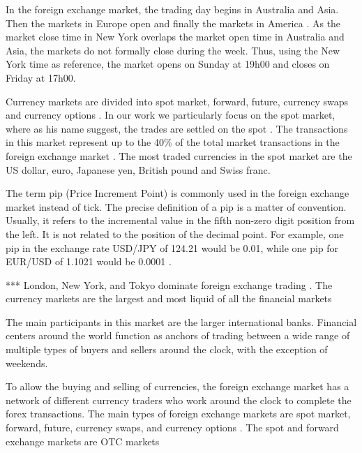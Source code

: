In the foreign exchange market, the trading day begins in Australia and Asia.
Then the markets in Europe open and finally the markets in America
\cite{forex_market_micro,forex_structure,book_forex_2,book_forex_3}. As the
market close time in New York overlaps the market open time in Australia and
Asia, the markets do not formally close during the week. Thus, using the New
York time as reference, the market opens on Sunday at 19h00 and closes on
Friday at 17h00.

Currency markets are divided into spot market, forward, future, currency swaps
and currency options \cite{book_forex_2,book_forex_3,book_forex_4}. In our work
we particularly focus on the spot market, where as his name suggest, the trades
are settled on the spot \cite{book_forex,book_forex_3}. The transactions in
this market represent up to the 40\% of the total market transactions in the
foreign exchange market \cite{book_forex}. The most traded currencies in the
spot market are the US dollar, euro, Japanese yen, British pound and Swiss
franc.

The term pip (Price Increment Point) is commonly used in the foreign exchange
market instead of tick. The precise definition of a pip is a matter of
convention. Usually, it refers to the incremental value in the fifth non-zero
digit position from the left. It is not related to the position of the decimal
point. For example, one pip in the exchange rate USD/JPY of 124.21 would be
0.01, while one pip for EUR/USD of 1.1021 would be 0.0001
\cite{forex_market_micro,forex_structure,order_flow_forex,micro_eff,book_forex_3}.

***
London, New York, and Tokyo dominate foreign exchange trading \cite{book_forex_4}. The currency markets are the largest and most liquid of all the financial markets

The main participants in this market are the larger international banks. Financial centers around the world function as anchors of trading between a wide range of multiple types of buyers and sellers around the clock, with the exception of weekends.

To allow the buying and selling of currencies, the foreign exchange market has a network of different currency  traders  who  work  around  the  clock  to  complete  the  forex  transactions.  The  main  types  of  foreign exchange markets are spot market, forward, future, currency swaps, and currency options \cite{book_forex_2,book_forex_3}. The spot and forward exchange markets are OTC markets

